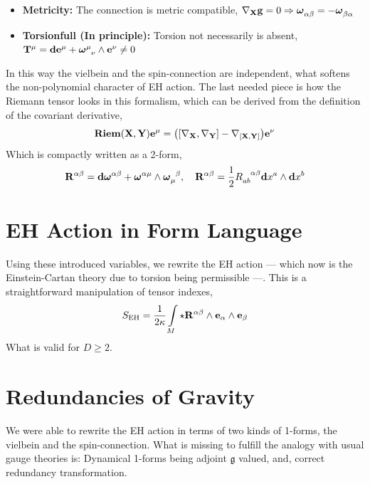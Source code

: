 \documentclass[a0,portrait]{a0poster}
\begin{document}
\begin{multicols}{2}
\begin{itemize}
    \item \textbf{Metricity:} The connection is metric compatible, $\nabla_{\vb X} \vb g =0\Rightarrow \tensor{{\boldsymbol\omega}}{_\alpha_\beta}=-\tensor{{\boldsymbol\omega}}{_\beta_\alpha}$
    \item \textbf{Torsionfull (In principle):} Torsion not necessarily is absent, $\vb T^\mu = \vb d \vb e^\mu+\tensor{{\boldsymbol\omega}}{^\mu_\nu}\wedge \vb e^\nu\neq0$
\end{itemize}
In this way the vielbein and the spin-connection are independent, what softens the non-polynomial character of EH action. 
The last needed piece is how the Riemann tensor looks in this formalism, which can be derived from the definition of the 
covariant derivative,
\[\vb {Riem}\qty(\vb X, \vb Y)\vb e^\mu=\qty(\comm{\nabla_{\vb X}}{\nabla_{\vb Y}}-\nabla_{\comm{\vb X}{\vb Y}})\vb e^\nu\]
Which is compactly written as a 2-form,
\[\vb R^{\alpha\beta} = \vb d\boldsymbol\omega^{\alpha\beta}+\boldsymbol\omega^{\alpha\mu}\wedge\tensor{{\boldsymbol\omega}}{_\mu^\beta},\ \ \ \vb R^{\alpha\beta} = \frac12 \tensor{R}{_a_b^\alpha^\beta}\vb dx^a\wedge\vb d x^b\]

\section*{EH Action in Form Language}

Using these introduced variables, we rewrite the EH action --- which now is the Einstein-Cartan theory due to torsion being permissible ---. 
This is a straightforward manipulation of tensor indexes,
\[S_{\textnormal{EH}}= \frac{1}{2\kappa}\int\limits_M\star\vb R^{\alpha\beta}\wedge \vb e_\alpha\wedge \vb e_\beta\]
What is valid for $D\geq 2$.

\section*{Redundancies of Gravity}

We were able to rewrite the EH action in terms of two kinds of 1-forms, the vielbein and the spin-connection. What is missing 
to fulfill the analogy with usual gauge theories is: Dynamical 1-forms being adjoint $\mathfrak g$ valued, and, correct redundancy 
transformation.


\end{multicols}
\end{document}
